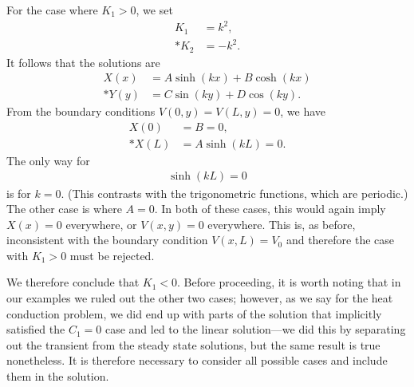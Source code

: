 For the case where $K_1 > 0$, we set
\begin{align}
  K_1 &= k^2 , \nonumber \\*
  K_2 &= -k^2 . \nonumber
\end{align}
It follows that the solutions are
\begin{subequations}
\begin{align}
  X(x) &= A \sinh ( k x ) + B \cosh ( k x ) \\*
  Y(y) &= C \sin ( k y ) + D \cos ( k y ) .
\end{align}
\end{subequations}
From the boundary conditions $V(0,y) = V(L,y) = 0$, we have
\begin{subequations}
\begin{align}
  X(0) &= B = 0, \nonumber \\* 
  X(L) &= A \sinh ( k L ) = 0. \nonumber
\end{align}
\end{subequations}
The only way for
\begin{align}
  \sinh ( k L ) = 0 \nonumber
\end{align}
is for $k = 0$. (This contrasts with the trigonometric functions, which are periodic.) The other case is where $A = 0$. In both of these cases, this would again imply $X(x) = 0$ everywhere, or $V(x,y) = 0$ everywhere. This is, as before, inconsistent with the boundary condition $V(x,L) = V_0$ and therefore the case with $K_1 > 0$ must be rejected.

We therefore conclude that $K_1 < 0$. Before proceeding, it is worth noting that in our examples we ruled out the other two cases; however, as we say for the heat conduction problem, we did end up with parts of the solution that implicitly satisfied the $C_1 = 0$ case and led to the linear solution---we did this by separating out the transient from the steady state solutions, but the same result is true nonetheless. It is therefore necessary to consider all possible cases and include them in the solution.

